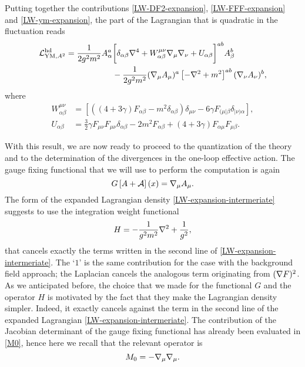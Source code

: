 Putting together the contributions \eqref{LW-DF2-expansion}, \eqref{LW-FFF-expansion} and \eqref{LW-ym-expansion}, the part of the Lagrangian that is quadratic in the fluctuation reads
\begin{equation}\label{LW-expansion-intermeriate}
\begin{split}
{ { \mathcal{L} } _{ { \text{YM} } ,A^2}^ { \text{hd} } }
	= 		\frac{1}{2 g^2 m^2 } A^a_\alpha   &
			\bigg[
				\delta_{\alpha \beta} { \mathcal{\nabla} }^4
  				+ W^{\mu\nu}_{\alpha\beta} { \mathcal{\nabla} }_{ \mu } { \mathcal{\nabla} }_{ \nu } 
  				+ U_{\alpha\beta}
 			\bigg]^{ab}
			 A^b_\beta \\
 	& - \frac{1}{2 g^2 m^2}( { \mathcal{\nabla} }_\mu A_\mu )^a
 			\left[
 				- { \mathcal{\nabla} }^2 +  m^2	 
 			\right]^{ab}
 			( { \mathcal{\nabla} }_\nu A_\nu )^b,
\end{split}
\end{equation}
where
\begin{align}
\label{V}
W^{\mu\nu}_{\alpha\beta} & =  \left[
  					\left(
  						(4 + 3 \gamma) F_{ \alpha \beta} 
	  					- m^2 \delta_{\alpha \beta} 
	  				\right) \delta_{\mu\nu}
  					- 6 \gamma F_{(\mu|  \beta }\delta_{|\nu ) \alpha }
  				\right],
  				\\
\label{U}
U_{\alpha \beta} & = \frac{3}{2} \gamma
 					F_{ \mu \nu } F_{ \mu \nu  }\delta_{ \alpha \beta }
	  			- 2 m^2 F_{\alpha \beta }
				+ \left(
				 		4 + 3 \gamma
				 	\right) F_{ \alpha \mu} F_{\mu \beta }.
\end{align}

With this result, we are now ready to proceed to the quantization of the theory and to the determination of the divergences in the one-loop effective action.
The gauge fixing functional that we will use to perform the computation is again 
\begin{equation}
G\left[A+\mathcal{A}\right](x) = { \mathcal{\nabla} }_\mu A_\mu.
\end{equation}
The form of the expanded Lagrangian density \eqref{LW-expansion-intermeriate} suggests to use the integration weight functional
\begin{equation}
H = -\frac{1}{g^2 m^2}{ \mathcal{\nabla} }^2 + \frac{1}{g^2} ,
\end{equation}
that cancels exactly the terms written in the second line of \eqref{LW-expansion-intermeriate}. The `$1$' is the same contribution for the \ym{} case with the background field approach; the Laplacian cancels the analogous term originating from $({ \mathcal{\nabla} } F)^2$. As we anticipated before, the choice that we made for the functional $G$ and the operator $H$ is motivated by the fact that they make the Lagrangian density simpler. Indeed, it exactly cancels against the term in the second line of the expanded Lagrangian \eqref{LW-expansion-intermeriate}. 
The contribution of the Jacobian determinant of the gauge fixing functional has already been evaluated in \eqref{M0}, hence here we recall that the relevant operator is
\begin{equation}
M_0
	=
-{ \mathcal{\nabla} }_\mu { \mathcal{\nabla} }_\mu .
\end{equation}

